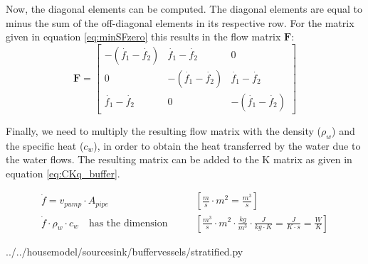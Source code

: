 Now, the diagonal elements can be computed. The diagonal elements are equal to minus the sum of the off-diagonal elements in its respective row. For the matrix given in equation \ref{eq:minSFzero} this results in the flow matrix $\mathbf{F}$:
\begin{equation}
	\mathbf{F} =  \begin{bmatrix}
		-(\dot{f_1}-\dot{f_2})   & \dot{f_1}-\dot{f_2} & 0 \\
		0     & -(\dot{f_1}-\dot{f_2})       & \dot{f_1}-\dot{f_2} \\
		\dot{f_1}-\dot{f_2}  & 0       & -(\dot{f_1}-\dot{f_2})     
	\end{bmatrix}
	\label{eq:flowmatrix}
\end{equation}

Finally, we need to multiply the resulting flow matrix with the density ($\rho_{w}$) and the specific heat ($c_{w}$), in order to obtain the heat transferred by the water due to the water flows. The resulting matrix can be added to the K matrix as given in equation \ref{eq:CKq_buffer}.

\begin{equation}
	\begin{aligned}
		\dot{f} = v_{pump} \cdot A_{pipe} \qquad & \left[ \frac{m}{s} \cdot m^2 = \frac{m^3}{s}\right] \\
		\dot{f} \cdot \rho_w \cdot c_w \quad \text{has the dimension} \qquad & \left[ \frac{m^3}{s} \cdot m^2 \cdot\frac{kg}{m^3} \cdot \frac{J}{kg \cdot K} = \frac{J}{K \cdot s} = \frac{W}{K}\right]
	\end{aligned}
\end{equation}


\usetikzlibrary{matrix,decorations.pathreplacing}


 
{../../housemodel/sourcesink/buffervessels/stratified.py}
